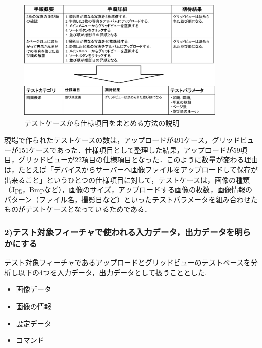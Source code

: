\documentclass[a4paper,12pt]{jreport}
\begin{document}
   \begin{figure}[htbp]
  \begin{center}
  \includegraphics[width=10cm]{./image/D-4-Fig8.png}
  \caption{テストケースから仕様項目をまとめる方法の説明}
  \label{fig:D-4-Fig8}
  \end{center}
   \end{figure}

現場で作られたテストケースの数は，アップロードが491ケース，グリッドビューが151ケースであった．仕様項目として整理した結果，アップロードが59項目，グリッドビューが22項目の仕様項目となった．このように数量が変わる理由は，たとえば「デバイスからサーバーへ画像ファイルをアップロードして保存が出来ること」というひとつの仕様項目に対して，テストケースは，画像の種類（Jpg，Bmpなど），画像のサイズ，アップロードする画像の枚数，画像情報のパターン（ファイル名，撮影日など）といったテストパラメータを組み合わせたものがテストケースとなっているためである．

\subsubsection{2)テスト対象フィーチャで使われる入力データ，出力データを明らかにする}
テスト対象フィーチャであるアップロードとグリッドビューのテストベースを分析し以下の4つを入力データ，出力データとして扱うこととした.
\begin{itemize}
 \item 画像データ
 \item 画像の情報
 \item 設定データ
  \item コマンド
\end{itemize}
\end{document}
